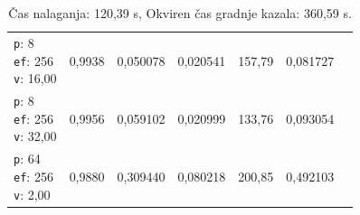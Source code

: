 \begin{table}[htbp]
\begin{tabularx}{\textwidth}{Xrrrrrr}
    \makecell{\texttt{p}: 8\\\texttt{ef}: 256\\\texttt{v}: 16,00} & 0,9938 & 0,050078 & 0,020541 & 157,79 & 0,081727 \\
    \makecell{\texttt{p}: 8\\\texttt{ef}: 256\\\texttt{v}: 32,00} & 0,9956 & 0,059102 & 0,020999 & 133,76 & 0,093054 \\
    \makecell{\texttt{p}: 64\\\texttt{ef}: 256\\\texttt{v}: 2,00} & 0,9880 & 0,309440 & 0,080218 & 200,85 & 0,492103 \\
    \bottomrule
  \end{tabularx}
\caption* {Čas nalaganja: 120,39 s, Okviren čas gradnje kazala: 360,59 s.}\end{table}


